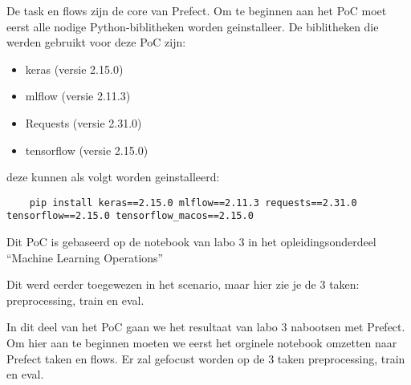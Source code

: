 De task en flows zijn de core van Prefect. Om te beginnen aan het PoC moet eerst alle nodige Python-biblitheken worden geinstalleer.
De biblitheken die werden gebruikt voor deze PoC zijn:
\begin{itemize}
    \item keras (versie 2.15.0)
    \item mlflow (versie 2.11.3)
    \item Requests (versie 2.31.0)
    \item tensorflow (versie 2.15.0)
\end{itemize}

deze kunnen als volgt worden geinstalleerd: 

\begin{verbatim}
    pip install keras==2.15.0 mlflow==2.11.3 requests==2.31.0 tensorflow==2.15.0 tensorflow_macos==2.15.0
\end{verbatim}

Dit PoC is gebaseerd op de notebook van labo 3 in het opleidingsonderdeel ``Machine Learning Operations''


Dit werd eerder toegewezen in het scenario, maar hier zie je de 3 taken: preprocessing, train en eval.

In dit deel van het PoC gaan we het resultaat van labo 3 nabootsen met Prefect.
Om hier aan te beginnen moeten we eerst het orginele notebook omzetten naar Prefect taken en flows. Er zal gefocust worden op de 3 taken preprocessing, train en eval.



